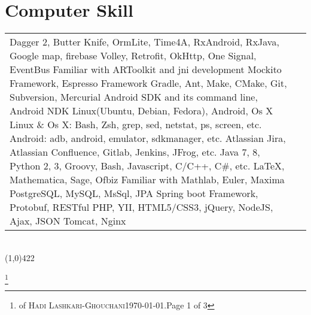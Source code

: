 \documentclass[10pt]{article}
\newcommand{\maxpages}{3}
\newcommand{\maxpages}{3}
\newcommand\HRule{\hspace*{.8cm}\line(1,0){422}\\}
\newenvironment{Record}[1]
{
    \vspace{-0.5cm}
    \section*{#1}
        \vspace{0.1cm}
        \begin{tabular}
}
{
        \end{tabular}\\
        \HRule
}
\newcommand{\FootNote}[1]{\let\thefootnote\relax\footnote{\smallsnellfont{\textbf{\textit{Curriculum Vitae}}} of \textsc{Hadi Lashkari-Ghouchani}\qquad\today.\qquad Page #1 of \maxpages}}
\begin{document}
\begin{Record}{Computer Skill}{l l}
    \ComputerSkill{Android Library}
        {Dagger 2, Butter Knife, OrmLite, Time4A, RxAndroid, RxJava, Google map, firebase}
        {Volley, Retrofit, OkHttp, One Signal, EventBus}
        {Familiar with ARToolkit and jni development}{}{}%
    \ComputerSkill{Android Test Library}
        {Mockito Framework, Espresso Framework}{}{}{}{}%
    \ComputerSkill{Tool}
        {Gradle, Ant, Make, CMake, Git, Subversion, Mercurial}
        {Android SDK and its command line, Android NDK}{}{}{}%
    \ComputerSkill{Operating System}
        {Linux(Ubuntu, Debian, Fedora), Android, Os X}{}{}{}{}%
    \ComputerSkill{Operating System tools}
        {Linux \& Os X: Bash, Zsh, grep, sed, netstat, ps, screen, etc.}
        {Android: adb, android, emulator, sdkmanager, etc.}{}{}{}%
    \ComputerSkill{Development tools}
        {Atlassian Jira, Atlassian Confluence, Gitlab, Jenkins, JFrog, etc.}
        {}{}{}{}%
    \ComputerSkill{Language}
        {Java 7, 8, Python 2, 3, Groovy, Bash, Javascript, C/C++, C\#, etc.}
        {}{}{}{}%
    \ComputerSkill{Special Software}
        {\LaTeX, Mathematica, Sage, Ofbiz}
        {Familiar with Mathlab, Euler, Maxima}{}{}{}%
    \ComputerSkill{Back-End Development}
        {PostgreSQL, MySQL, MsSql, JPA}
        {Spring boot Framework, Protobuf, RESTful}
        {PHP, YII, HTML5/CSS3, jQuery, NodeJS, Ajax, JSON}
        {Tomcat, Nginx}{}%
\end{Record}


\FootNote{1}

\end{document}
